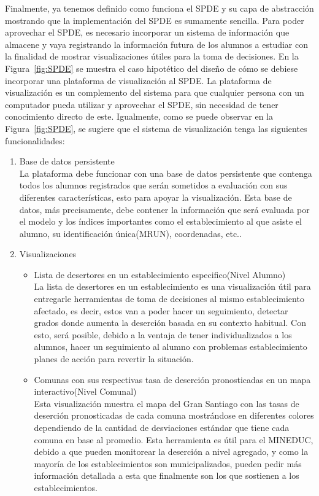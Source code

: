 Finalmente, ya tenemos definido como funciona el SPDE y su capa de abstracción mostrando que la implementación del SPDE es sumamente sencilla. Para poder aprovechar el SPDE, es necesario incorporar un sistema de información que almacene y vaya registrando la información futura de los alumnos a estudiar con la finalidad de mostrar visualizaciones útiles para la toma de decisiones. En la Figura~\ref{fig:SPDE} se muestra el caso hipotético del diseño de cómo se debiese incorporar una plataforma de visualización al SPDE. La plataforma de visualización es un complemento del sistema para que cualquier persona con un computador pueda utilizar y aprovechar el SPDE, sin necesidad de tener conocimiento directo de este. Igualmente, como se puede observar en la Figura~\ref{fig:SPDE}, se sugiere que el sistema de visualización tenga las siguientes funcionalidades:
\begin{enumerate}
\item Base de datos persistente \\ \hfill
La plataforma debe funcionar con una base de datos persistente que contenga todos los alumnos registrados que serán sometidos a evaluación con sus diferentes características, esto para apoyar la visualización. Esta base de datos, más precisamente, debe contener la información que será evaluada por el modelo y los índices importantes como el establecimiento al que asiste el alumno, su identificación única(MRUN), coordenadas, etc..
\item Visualizaciones
    \begin{itemize}
    \item Lista de desertores en un establecimiento especifico(Nivel Alumno) \\ \hfill
    La lista de desertores en un establecimiento es una visualización útil para entregarle herramientas de toma de decisiones al mismo establecimiento afectado, es decir, estos van a poder hacer un seguimiento, detectar grados donde aumenta la deserción basada en su contexto habitual. Con esto, será posible, debido a la ventaja de tener individualizados a los alumnos, hacer un seguimiento al alumno con problemas establecimiento planes de acción para revertir la situación.
    \item Comunas con sus respectivas tasa de deserción pronosticadas en un mapa interactivo(Nivel Comunal) \\ \hfill
    Esta visualización muestra el mapa del Gran Santiago con las tasas de deserción pronosticadas de cada comuna mostrándose en diferentes colores dependiendo de la cantidad de desviaciones estándar que tiene cada comuna en base al promedio. Esta herramienta es útil para el MINEDUC, debido a que pueden monitorear la deserción a nivel agregado, y como la mayoría de los establecimientos son municipalizados, pueden pedir más información detallada a esta que finalmente son los que sostienen a los establecimientos.

\end{itemize}
\end{enumerate}
